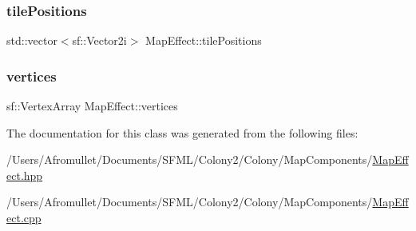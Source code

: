 \mbox{\label{class_map_effect_a3a61ab548ae00ef7abd123672c75e579}} 
\subsubsection{\texorpdfstring{tile\+Positions}{tilePositions}}
{\footnotesize\ttfamily std\+::vector$<$sf\+::\+Vector2i$>$ Map\+Effect\+::tile\+Positions}

\mbox{\label{class_map_effect_ae3ee2ef0f261d4527b5af20e788af26e}} 
\subsubsection{\texorpdfstring{vertices}{vertices}}
{\footnotesize\ttfamily sf\+::\+Vertex\+Array Map\+Effect\+::vertices}



The documentation for this class was generated from the following files\+:\begin{DoxyCompactItemize}
\item 
/\+Users/\+Afromullet/\+Documents/\+S\+F\+M\+L/\+Colony2/\+Colony/\+Map\+Components/\mbox{\hyperlink{_map_effect_8hpp}{Map\+Effect.\+hpp}}\item 
/\+Users/\+Afromullet/\+Documents/\+S\+F\+M\+L/\+Colony2/\+Colony/\+Map\+Components/\mbox{\hyperlink{_map_effect_8cpp}{Map\+Effect.\+cpp}}\end{DoxyCompactItemize}
